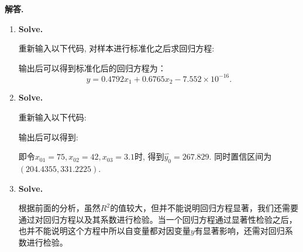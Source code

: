 \documentclass[12pt, a4paper, oneside]{ctexart}
\newenvironment{solution}{\par\noindent\textbf{解答. }}{\par}
\begin{document}
\begin{solution}
\begin{enumerate}
		\item {\tt }   {\bf Solve.}
		
		
		重新输入以下代码, 对样本进行标准化之后求回归方程:
		
		输出后可以得到标准化后的回归方程为：
			\[ y = 0.4792x_1 + 0.6765x_2 - 7.552\times{10}^{-16}. \]
		
		
		\item {\tt}    {\bf Solve.} 
		
		重新输入以下代码:
		
		输出后可以得到:
		
		即令$x_{01}=75,x_{02}=42,x_{03}=3.1$时, 得到$\hat{y_0} = 267.829$. 同时置信区间为$ \left(204.4355,331.2225\right) .$
		
		\item {\tt }   {\bf Solve.}
		
		根据前面的分析，虽然$R^2$的值较大，但并不能说明回归方程显著，我们还需要通过对回归方程以及其系数进行检验。当一个回归方程通过显著性检验之后，也并不能说明这个方程中所以自变量都对因变量$y$有显著影响，还需对回归系数进行检验。
	\end{enumerate} 
\end{solution}
\end{document}
